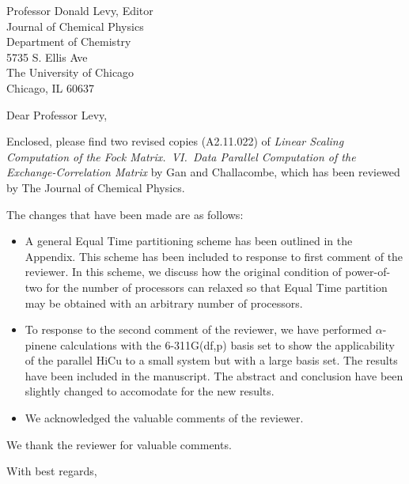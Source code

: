 
\pagestyle{empty}

\signature{Matt Challacombe}

\address{
Dr.~Matt Challacombe \\
(mchalla@lanl.gov) \\
Theoretical Division \\
Group T-12, MS B268 \\
Los Alamos National Laboratory \\
Los Alamos, NM 87545 }

\begin{letter}{
Professor Donald Levy, Editor\\
Journal of Chemical Physics\\
Department of Chemistry\\
5735 S. Ellis Ave\\
The University of Chicago\\
Chicago, IL 60637}

\opening{Dear Professor Levy,}

Enclosed, please find two revised copies (A2.11.022) of 
{\em Linear Scaling Computation of the Fock Matrix.~VI.~Data 
Parallel Computation 
of the Exchange-Correlation Matrix} by Gan and Challacombe, which has been
reviewed by The Journal of Chemical Physics.

The changes that have been made are as follows:
\pagebreak

\begin{itemize}
\item A general Equal Time partitioning scheme has been 
outlined in the Appendix. This scheme has been included to response to
first comment of the reviewer. In this scheme, we discuss how the original
condition of power-of-two for the number of processors 
can relaxed so that Equal Time partition may be obtained with
an arbitrary number of processors.

\item To response to the second comment of the reviewer,
we have performed $\alpha$-pinene calculations with the 6-311G(df,p) basis
set to show the applicability of the parallel HiCu to a small system but with
a large basis set. The results have been included in the manuscript. 
The abstract and conclusion have been slightly changed to accomodate for 
the new results. 

\item We acknowledged the valuable comments of the reviewer.

\end{itemize}

We thank the reviewer for valuable comments.

\closing{With best regards,}
\end{letter}


